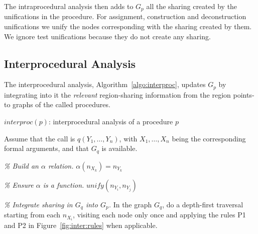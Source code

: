 \documentclass{tlp}
\newcommand{\args}[2][X]{\ensuremath{#1_1, \ldots, #1_#2}}
\begin{document}
The intraprocedural analysis then adds to $G_p$
all the sharing created by the unifications in the procedure.
For assignment, construction and deconstruction unifications
we unify the nodes corresponding with the sharing created by them.
We ignore test unifications because they do not create any sharing.

\subsection{Interprocedural Analysis}

The interprocedural analysis, Algorithm~\ref{algo:interproc},
updates $G_p$ by integrating into it
the \emph{relevant} region-sharing information
from the region points-to graphs of the called procedures.

\begin{algorithm}
    \small
    \caption{$\mathit{interproc}(p)$:
    interprocedural analysis of a procedure $p$}
    \label{algo:interproc}
\begin{algorithmic}

    \REPEAT
            \STATE Assume that the call is $q(\args[Y]{n})$,
            with \args[X]{n} being the corresponding formal arguments,
            and that $G_q$ is available.

            \STATE
            \STATE \emph{\% Build an $\alpha$ relation.}
                \STATE $\alpha(n_{X_k}) = n_{Y_k}$
            \ENDFOR

            \STATE
            \STATE \emph{\% Ensure $\alpha$ is a function.}
                    \STATE  $\mathit{unify}(n_{Y_i}, n_{Y_j})$
                \ENDIF
            \ENDFOR

            \STATE
            \STATE \emph{\% Integrate sharing in $G_q$ into $G_p$.}
            \STATE In the graph $G_q$, do a depth-first traversal
                starting from each $n_{X_i}$,
                visiting each node only once
                and applying the rules P1 and P2 in
                Figure~\ref{fig:inter:rules} when applicable.
        \ENDFOR

\end{algorithmic}
\normalsize
\end{algorithm}
\end{document}

